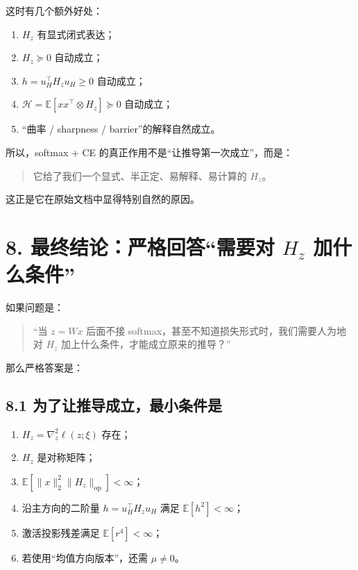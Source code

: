 \documentclass[11pt]{ctexart}
\begin{document}
这时有几个额外好处：

\begin{enumerate}[label=\arabic*.]
    \item $H_z$ 有显式闭式表达；
    \item $H_z \succeq 0$ 自动成立；
    \item $h = u_H^\top H_z u_H \ge 0$ 自动成立；
    \item $\mathcal{H} = \mathbb{E}[xx^\top \otimes H_z] \succeq 0$ 自动成立；
    \item “曲率 / sharpness / barrier”的解释自然成立。
\end{enumerate}

所以，softmax + CE 的真正作用不是“让推导第一次成立”，而是：

\begin{quote}
它给了我们一个显式、半正定、易解释、易计算的 $H_z$。
\end{quote}

这正是它在原始文档中显得特别自然的原因。

\section*{8. 最终结论：严格回答“需要对 $H_z$ 加什么条件”}

如果问题是：

\begin{quote}
“当 $z=Wx$ 后面不接 softmax，甚至不知道损失形式时，我们需要人为地对 $H_z$ 加上什么条件，才能成立原来的推导？”
\end{quote}

那么严格答案是：

\subsection*{8.1 为了让\textbf{推导}成立，最小条件是}

\begin{enumerate}[label=\textbf{(A\arabic*)}]
    \item $H_z = \nabla_z^2 \ell(z;\xi)$ 存在；
    \item $H_z$ 是对称矩阵；
    \item $\mathbb{E}[\|x\|_2^2 \|H_z\|_{\mathrm{op}}] < \infty$；
    \item 沿主方向的二阶量 $h = u_H^\top H_z u_H$ 满足 $\mathbb{E}[h^2] < \infty$；
    \item 激活投影残差满足 $\mathbb{E}[r^4] < \infty$；
    \item 若使用“均值方向版本”，还需 $\mu \neq 0$。
\end{enumerate}
\end{document}
